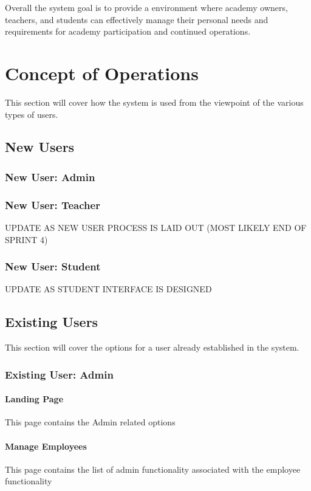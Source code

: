 Overall the system goal is to provide a environment where academy owners, teachers, and students can effectively manage their personal needs and requirements for academy participation and continued operations.

\section{Concept of Operations}
This section will cover how the system is used from the viewpoint of the various types of users.

\subsection{New Users}

\subsubsection{New User: Admin}
\subsubsection{New User: Teacher}
UPDATE AS NEW USER PROCESS IS LAID OUT (MOST LIKELY END OF SPRINT 4)
\subsubsection{New User: Student}
UPDATE AS STUDENT INTERFACE IS DESIGNED

\subsection{Existing Users}
This section will cover the options for a user already established in the system.

\subsubsection{Existing User: Admin}

\paragraph{Landing Page}
This page contains the Admin related options

\paragraph{Manage Employees}
This page contains the list of admin functionality associated with the employee functionality

